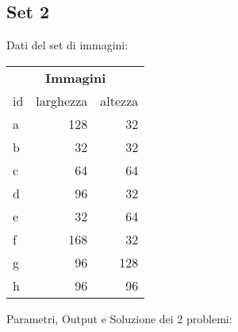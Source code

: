 \newpage


	\subsection{Set 2}
Dati del set di immagini: 

\begin{table}[H]
\centering
\footnotesize
\begin{tabular}{l|r|r}
\multicolumn{3}{c}{\textbf{Immagini}} \\ 
id & larghezza & altezza \\
\hline
a & 128 & 32 \\
b & 32&32\\
c & 64& 64\\
d & 96&32\\
e & 32&64\\
f & 168 &32\\
g & 96&128\\
h & 96& 96\\
\end{tabular}
\end{table}


\noindent Parametri, Output e Soluzione dei 2 problemi: 

